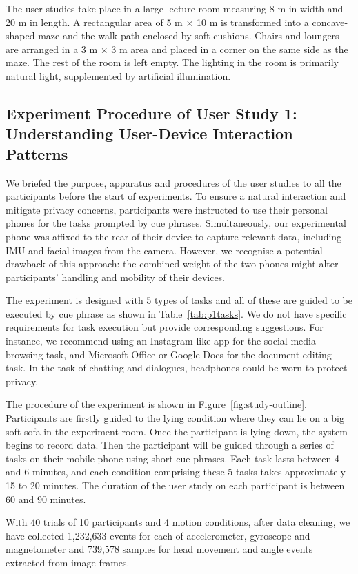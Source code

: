 The user studies take place in a large lecture room measuring 8 m in width and 20 m in length. A rectangular area of 5 m $\times$ 10 m is transformed into a concave-shaped maze and the walk path enclosed by soft cushions. Chairs and loungers are arranged in a 3 m $\times$ 3 m area and placed in a corner on the same side as the maze. The rest of the room is left empty. The lighting in the room is primarily natural light, supplemented by artificial illumination.


\subsection{Experiment Procedure of User Study 1: Understanding User-Device Interaction Patterns}

We briefed the purpose, apparatus and procedures of the user studies to all the participants before the start of experiments. To ensure a natural interaction and mitigate privacy concerns, participants were instructed to use their personal phones for the tasks prompted by cue phrases. Simultaneously, our experimental phone was affixed to the rear of their device to capture relevant data, including IMU and facial images from the camera. However, we recognise a potential drawback of this approach: the combined weight of the two phones might alter participants' handling and mobility of their devices.

The experiment is designed with 5 types of tasks and all of these are guided to be executed by cue phrase as shown in Table~\ref{tab:p1tasks}. We do not have specific requirements for task execution but provide corresponding suggestions. For instance, we recommend using an Instagram-like app for the social media browsing task, and Microsoft Office or Google Docs for the document editing task. In the task of chatting and dialogues, headphones could be worn to protect privacy.

The procedure of the experiment is shown in Figure~\ref{fig:study-outline}. Participants are firstly guided to the lying condition where they can lie on a big soft sofa in the experiment room. Once the participant is lying down, the system begins to record data. Then the participant will be guided through a series of tasks on their mobile phone using short cue phrases. Each task lasts between 4 and 6 minutes, and each condition comprising these 5 tasks takes approximately 15 to 20 minutes. The duration of the user study on each participant is between 60 and 90 minutes. 

With 40 trials of 10 participants and 4 motion conditions, after data cleaning, we have collected 1,232,633 events for each of accelerometer, gyroscope and magnetometer and 739,578 samples for head movement and angle events extracted from image frames. 

